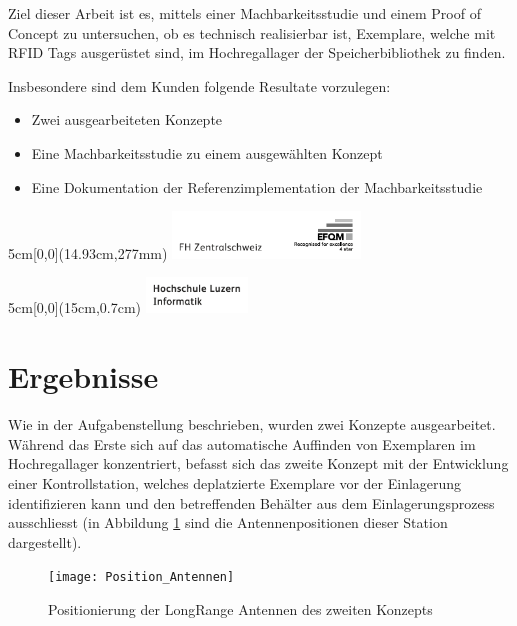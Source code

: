 \documentclass[
	a4paper
]{scrartcl}
\begin{document}
Ziel dieser Arbeit ist es, mittels einer Machbarkeitsstudie und einem Proof of Concept zu untersuchen, ob es technisch realisierbar ist, Exemplare, welche mit RFID Tags ausgerüstet sind, im Hochregallager der Speicherbibliothek zu finden.

Insbesondere sind dem Kunden folgende Resultate vorzulegen:
\begin{itemize}[noitemsep]
	\item Zwei ausgearbeiteten Konzepte
	\item Eine Machbarkeitsstudie zu einem ausgewählten Konzept
	\item Eine Dokumentation der Referenzimplementation der Machbarkeitsstudie
\end{itemize}

\vspace{0.5em}
\noindent
\begin{textblock*}{5cm}[0,0](14.93cm,277mm)
	\includegraphics[keepaspectratio,width=5cm]{img/FHZ_Logo}
\end{textblock*}

\newpage

\begin{textblock*}{5cm}[0,0](15cm,0.7cm)
	\includegraphics[keepaspectratio,width=2.7cm]{img/HSLU_Logo_Header}
\end{textblock*}

\section{Ergebnisse}
Wie in der Aufgabenstellung beschrieben, wurden zwei Konzepte ausgearbeitet. Während das Erste sich auf das automatische Auffinden von Exemplaren im Hochregallager konzentriert, befasst sich das zweite Konzept mit der Entwicklung einer Kontrollstation, welches deplatzierte Exemplare vor der Einlagerung identifizieren kann und den betreffenden Behälter aus dem Einlagerungsprozess ausschliesst (in Abbildung \ref{fig:PosAntennen} sind die Antennenpositionen dieser Station dargestellt).

\begin{figure}[htb]
	\centering
	\texttt{[image: Position\_Antennen]}
	\caption{Positionierung der LongRange Antennen des zweiten Konzepts}
	\label{fig:PosAntennen}
\end{figure}
\end{document}
